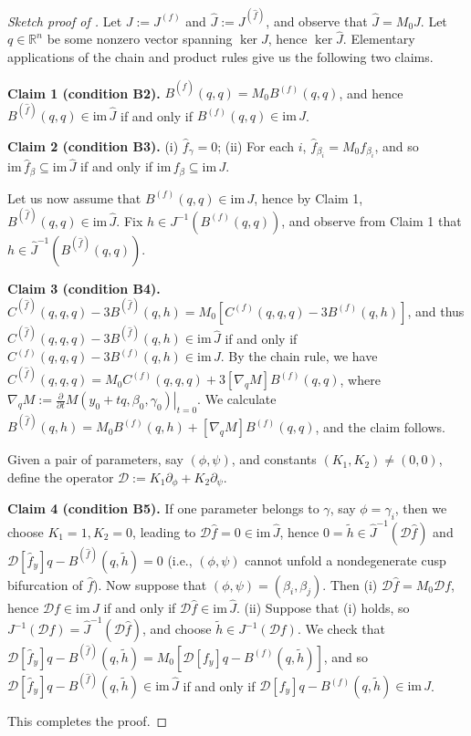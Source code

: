 \documentclass[11pt]{amsart}
\newcommand{\R}{\mathbb{R}}
\newcommand{\wJ}{\hat{J}}
\newcommand{\mD}{\mathcal{D}}
\theoremstyle{definition}
\begin{document}
\begin{proof}[Sketch proof of ]
Let $J:=J^{(f)}$ and $\wJ:=J^{(\hat{f})}$, and observe that $\wJ = M_0J$. Let $q \in \R^n$ be some nonzero vector spanning $\ker J$, hence $\ker \wJ$. Elementary applications of the chain and product rules give us the following two claims.

{\bf Claim 1 (condition B2).} $B^{(\hat{f})}(q, q) = M_0 B^{(f)}(q, q)$, and hence $B^{(\hat{f})}(q, q) \in \mathrm{im}\,\wJ$ if and only if $B^{(f)}(q, q) \in \mathrm{im}\,J$. 

{\bf Claim 2 (condition B3).} (i) $\hat{f}_\gamma = 0$; (ii) For each $i$, $\hat{f}_{\beta_i} = M_0 f_{\beta_i}$, and so $\mathrm{im}\,\hat{f}_\beta \subseteq \mathrm{im}\,\wJ$ if and only if $\mathrm{im}\,f_\beta \subseteq \mathrm{im}\,J$. 

Let us now assume that $B^{(f)}(q, q) \in \mathrm{im}\,J$, hence by Claim 1, $B^{(\hat{f})}(q, q) \in \mathrm{im}\,\wJ$. Fix $h \in J^{-1}(B^{(f)}(q,q))$, and observe from Claim 1 that $h \in \wJ^{-1}(B^{(\hat{f})}(q,q))$. 

{\bf Claim 3 (condition B4).} $C^{(\hat{f})}(q,q,q) - 3B^{(\hat{f})}(q,h) =  M_0\left[C^{(f)}(q,q,q) -3B^{(f)}(q, h)\right]$, and thus $C^{(\hat{f})}(q,q,q) - 3B^{(\hat{f})}(q,h) \in \mathrm{im}\,\wJ$ if and only if $C^{(f)}(q,q,q) -3B^{(f)}(q, h) \in \mathrm{im}\,J$. By the chain rule, we have $C^{(\hat{f})}(q,q,q) = M_0C^{(f)}(q,q,q)+ 3 [\nabla_{q} M]B^{(f)}(q,q)$, where $\nabla_{q} M := \left.\frac{\partial}{\partial t} M(y_0 + tq, \beta_0, \gamma_0)\right|_{t=0}$. We calculate $B^{(\hat{f})}(q, h) = M_0B^{(f)}(q, h) + [\nabla_{q}M] B^{(f)}(q,q)$, and the claim follows. 

Given a pair of parameters, say $(\phi, \psi)$, and constants $(K_1,K_2) \neq (0,0)$, define the operator $\mathcal{D}:= K_1\partial_{\phi} + K_2 \partial_\psi$. 

{\bf Claim 4 (condition B5).} If one parameter belongs to $\gamma$, say $\phi = \gamma_i$, then we choose $K_1=1, K_2=0$, leading to $\mathcal{D}\hat{f} = 0 \in \mathrm{im}\,\wJ$, hence $0 = \tilde{h} \in \wJ^{-1}(\mathcal{D} \hat{f})$ and $\mathcal{D}[\hat{f}_y] q - B^{(\hat{f})}(q,\tilde{h}) = 0$ (i.e., $(\phi, \psi)$ cannot unfold a nondegenerate cusp bifurcation of $\hat{f}$). Now suppose that $(\phi, \psi) = (\beta_i, \beta_j)$. Then (i) $\mathcal{D} \hat{f} = M_0\mathcal{D} f$, hence $\mD f \in \mathrm{im}\,J$ if and only if $\mD \hat{f} \in \mathrm{im}\,\wJ$. (ii) Suppose that (i) holds, so $J^{-1}(\mathcal{D} f)= \wJ^{-1}(\mathcal{D} \hat{f})$, and choose $\tilde{h} \in J^{-1}(\mathcal{D} f)$. We check that $\mathcal{D}[\hat{f}_y] q - B^{(\hat{f})}(q,\tilde{h}) = M_0[\mathcal{D}[f_y] q - B^{(f)}(q,\tilde{h})]$, and so $\mathcal{D}[\hat{f}_y] q - B^{(\hat{f})}(q,\tilde{h}) \in\mathrm{im}\,\wJ$ if and only if $\mathcal{D}[f_y] q - B^{(f)}(q,\tilde{h}) \in \mathrm{im}\,J$. 

This completes the proof.
\end{proof}
\end{document}
